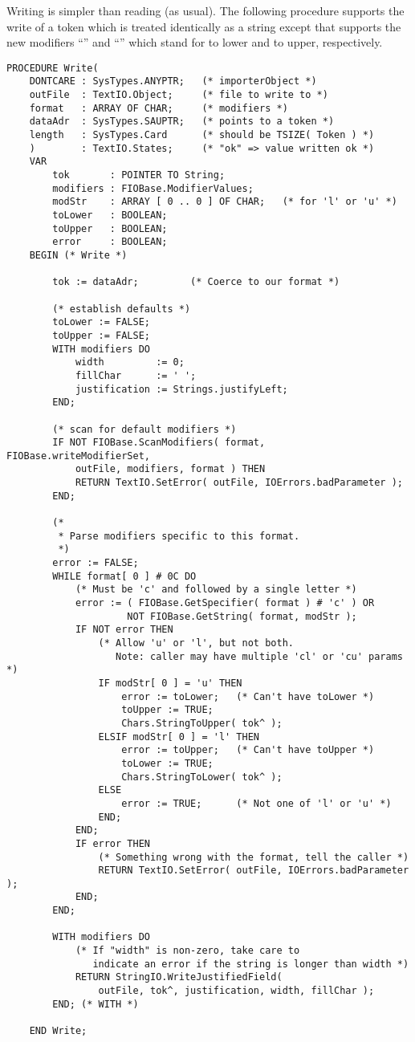 Writing is simpler than reading (as usual).  The following procedure
supports the write of a token which is treated identically as a string
except that  supports the new modifiers ``''
and ``'' which stand for to lower and to upper, respectively.
\begin{verbatim}
PROCEDURE Write(
    DONTCARE : SysTypes.ANYPTR;   (* importerObject *)
    outFile  : TextIO.Object;     (* file to write to *)
    format   : ARRAY OF CHAR;     (* modifiers *)
    dataAdr  : SysTypes.SAUPTR;   (* points to a token *)
    length   : SysTypes.Card      (* should be TSIZE( Token ) *)
    )        : TextIO.States;     (* "ok" => value written ok *)
    VAR
        tok       : POINTER TO String;
        modifiers : FIOBase.ModifierValues;
        modStr    : ARRAY [ 0 .. 0 ] OF CHAR;   (* for 'l' or 'u' *)
        toLower   : BOOLEAN;
        toUpper   : BOOLEAN;
        error     : BOOLEAN;
    BEGIN (* Write *)

        tok := dataAdr;         (* Coerce to our format *)

        (* establish defaults *)
        toLower := FALSE;
        toUpper := FALSE;
        WITH modifiers DO
            width         := 0;
            fillChar      := ' ';
            justification := Strings.justifyLeft;
        END;

        (* scan for default modifiers *)
        IF NOT FIOBase.ScanModifiers( format, FIOBase.writeModifierSet,
            outFile, modifiers, format ) THEN
            RETURN TextIO.SetError( outFile, IOErrors.badParameter );
        END;

        (*
         * Parse modifiers specific to this format.
         *)
        error := FALSE;
        WHILE format[ 0 ] # 0C DO
            (* Must be 'c' and followed by a single letter *)
            error := ( FIOBase.GetSpecifier( format ) # 'c' ) OR
                     NOT FIOBase.GetString( format, modStr );
            IF NOT error THEN
                (* Allow 'u' or 'l', but not both.
                   Note: caller may have multiple 'cl' or 'cu' params *)
                IF modStr[ 0 ] = 'u' THEN
                    error := toLower;   (* Can't have toLower *)
                    toUpper := TRUE;
                    Chars.StringToUpper( tok^ );
                ELSIF modStr[ 0 ] = 'l' THEN
                    error := toUpper;   (* Can't have toUpper *)
                    toLower := TRUE;
                    Chars.StringToLower( tok^ );
                ELSE
                    error := TRUE;      (* Not one of 'l' or 'u' *)
                END;
            END;                     
            IF error THEN
                (* Something wrong with the format, tell the caller *)
                RETURN TextIO.SetError( outFile, IOErrors.badParameter );
            END;
        END;
       
        WITH modifiers DO
            (* If "width" is non-zero, take care to
               indicate an error if the string is longer than width *)
            RETURN StringIO.WriteJustifiedField(
                outFile, tok^, justification, width, fillChar );
        END; (* WITH *)

    END Write;
\end{verbatim}

